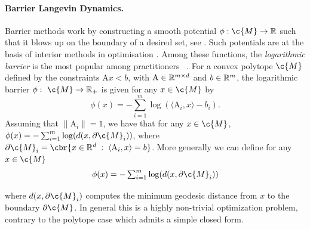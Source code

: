 \paragraph{Barrier Langevin Dynamics.}
Barrier methods work by constructing a smooth potential $\phi: \c{M} \rightarrow \R$ such that it blows up on the boundary of a desired set, see \textcite{nesterov2018lectures}.
Such potentials are at the basis of interior methods in optimisation \parencite{boyd2004convex}.
Among these functions, the \emph{logarithmic barrier} is the most popular among practitioners ~\parencite{lee2017Geodesic}.
For a convex polytope $\c{M}$ defined by the constraints $\mathrm{A} x < b$, with $\mathrm{A} \in \mathbb{R}^{m \times d}$ and $b \in \mathbb{R}^m$, the logarithmic barrier $\phi: \ \c{M} \to \R_+$ is given for any $x \in \c{M}$ by \begin{equation} \label{eq:log_barrier_polytope} \textstyle{ \phi(x) = - \sum_{i=1}^m \log(\langle \mathrm{A}_i, x\rangle-b_i).
	}
\end{equation}
Assuming that $\| \mathrm{A}_i \| =1$, we have that for any $x \in \c{M}$, $\phi(x) = - \sum_{i=1}^m \log(d(x, \partial \c{M}_i))$, where $\partial \c{M}_i = \cbr{x \in \R^d \; : \; \langle \mathrm{A}_i, x\rangle =b}$.
More generally we can define for any $x \in \c{M}$ \begin{equation} \label{eq:log_barrier_manifold} \textstyle{ \phi(x) = - \sum_{i=1}^m \log(d(x, \partial \c{M}_i)) } \end{equation} 

where $d(x, \partial \c{M}_i)$ computes the minimum geodesic distance from $x$ to the boundary $\partial \c{M}$.
In general this is a highly non-trivial optimization problem, contrary to the polytope case which admits a simple closed form.

